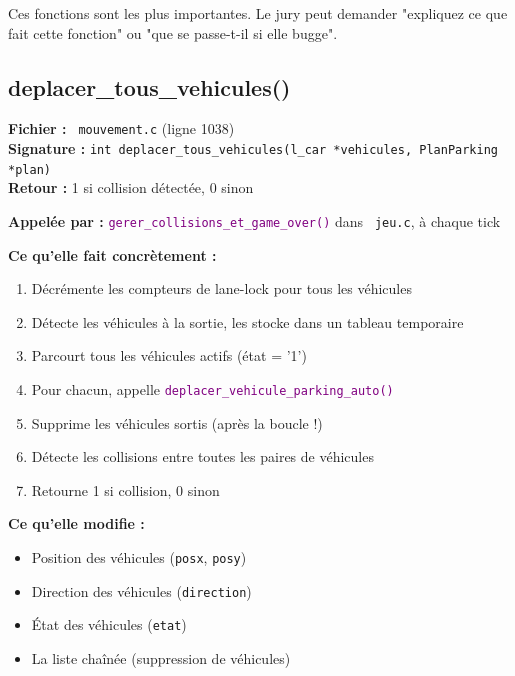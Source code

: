 \documentclass[11pt,a4paper]{article}
\newcommand{\code}[1]{\texttt{\textcolor{accent}{#1}}}
\newcommand{\fichier}[1]{\texttt{\textcolor{primary}{\faIcon{file-code} #1}}}
\newcommand{\fonction}[1]{\texttt{\textcolor{purple}{#1()}}}
\newcommand{\variable}[1]{\texttt{\textcolor{success}{#1}}}
\begin{document}
\begin{dangerbox}
Ces fonctions sont les plus importantes. Le jury peut demander "expliquez ce que fait cette fonction" ou "que se passe-t-il si elle bugge".
\end{dangerbox}

\subsection{deplacer\_tous\_vehicules()}

\begin{funcbox}
\textbf{Fichier :} \fichier{mouvement.c} (ligne 1038)\\
\textbf{Signature :} \code{int deplacer\_tous\_vehicules(l\_car *vehicules, PlanParking *plan)}\\
\textbf{Retour :} 1 si collision détectée, 0 sinon
\end{funcbox}

\textbf{Appelée par :} \fonction{gerer\_collisions\_et\_game\_over} dans \fichier{jeu.c}, à chaque tick

\textbf{Ce qu'elle fait concrètement :}
\begin{enumerate}[noitemsep]
    \item Décrémente les compteurs de lane-lock pour tous les véhicules
    \item Détecte les véhicules à la sortie, les stocke dans un tableau temporaire
    \item Parcourt tous les véhicules actifs (état = '1')
    \item Pour chacun, appelle \fonction{deplacer\_vehicule\_parking\_auto}
    \item Supprime les véhicules sortis (après la boucle !)
    \item Détecte les collisions entre toutes les paires de véhicules
    \item Retourne 1 si collision, 0 sinon
\end{enumerate}

\textbf{Ce qu'elle modifie :}
\begin{itemize}[noitemsep]
    \item Position des véhicules (\variable{posx}, \variable{posy})
    \item Direction des véhicules (\variable{direction})
    \item État des véhicules (\variable{etat})
    \item La liste chaînée (suppression de véhicules)
\end{itemize}
\end{document}
